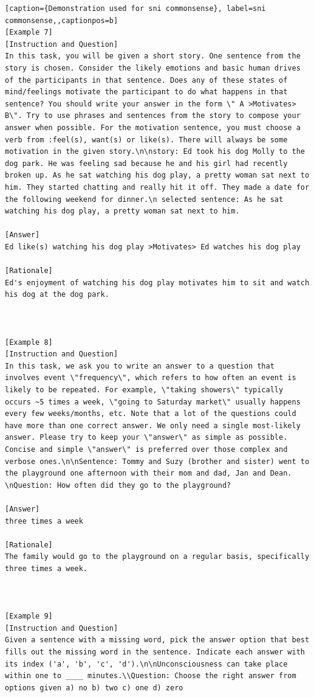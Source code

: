 \begin{lstlisting}[caption={Demonstration used for sni commonsense}, label=sni commonsense,,captionpos=b]
[Example 7]
[Instruction and Question]
In this task, you will be given a short story. One sentence from the story is chosen. Consider the likely emotions and basic human drives of the participants in that sentence. Does any of these states of mind/feelings motivate the participant to do what happens in that sentence? You should write your answer in the form \" A >Motivates> B\". Try to use phrases and sentences from the story to compose your answer when possible. For the motivation sentence, you must choose a verb from :feel(s), want(s) or like(s). There will always be some motivation in the given story.\n\nstory: Ed took his dog Molly to the dog park. He was feeling sad because he and his girl had recently broken up. As he sat watching his dog play, a pretty woman sat next to him. They started chatting and really hit it off. They made a date for the following weekend for dinner.\n selected sentence: As he sat watching his dog play, a pretty woman sat next to him.

[Answer]
Ed like(s) watching his dog play >Motivates> Ed watches his dog play

[Rationale]
Ed's enjoyment of watching his dog play motivates him to sit and watch his dog at the dog park.



[Example 8]
[Instruction and Question]
In this task, we ask you to write an answer to a question that involves event \"frequency\", which refers to how often an event is likely to be repeated. For example, \"taking showers\" typically occurs ~5 times a week, \"going to Saturday market\" usually happens every few weeks/months, etc. Note that a lot of the questions could have more than one correct answer. We only need a single most-likely answer. Please try to keep your \"answer\" as simple as possible. Concise and simple \"answer\" is preferred over those complex and verbose ones.\n\nSentence: Tommy and Suzy (brother and sister) went to the playground one afternoon with their mom and dad, Jan and Dean. \nQuestion: How often did they go to the playground?

[Answer]
three times a week

[Rationale]
The family would go to the playground on a regular basis, specifically three times a week.



[Example 9]
[Instruction and Question]
Given a sentence with a missing word, pick the answer option that best fills out the missing word in the sentence. Indicate each answer with its index ('a', 'b', 'c', 'd').\n\nUnconsciousness can take place within one to ____ minutes.\\Question: Choose the right answer from options given a) no b) two c) one d) zero


\end{lstlisting}
